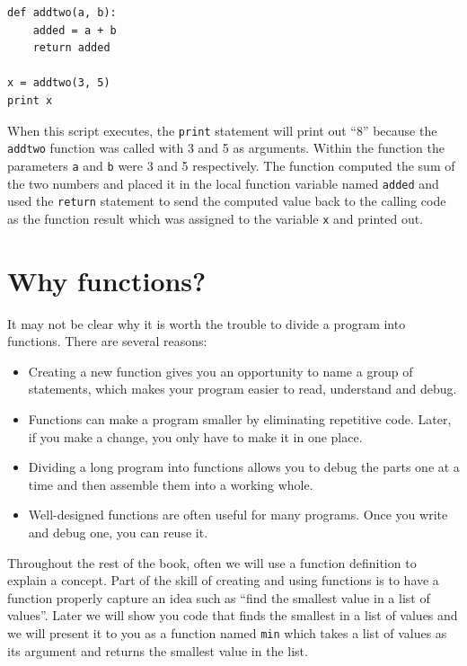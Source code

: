 \documentclass[10pt]{book}
\begin{document}
\beforeverb
\begin{verbatim}
def addtwo(a, b):
    added = a + b
    return added

x = addtwo(3, 5)
print x
\end{verbatim}
\afterverb
%
When this script executes, the {\tt print} statement will print out ``8''
because the {\tt addtwo} function was called with 3 and 5 as arguments.
Within the function the parameters {\tt a} and {\tt b} were 3 and 5 
respectively. The function computed the sum of the two numbers and placed
it in the local function variable named {\tt added} 
and used the {\tt return} statement 
to send the computed value back to the calling code 
as the function result which was assigned
to the variable {\tt x} and printed out.


\section{Why functions?}

It may not be clear why it is worth the trouble to divide
a program into functions.  There are several reasons:

\begin{itemize}

\item Creating a new function gives you an opportunity to name a group
of statements, which makes your program easier to read, understand 
and debug.

\item Functions can make a program smaller by eliminating repetitive
code.  Later, if you make a change, you only have
to make it in one place.

\item Dividing a long program into functions allows you to debug the
parts one at a time and then assemble them into a working whole.

\item Well-designed functions are often useful for many programs.
Once you write and debug one, you can reuse it.

\end{itemize}

Throughout the rest of the book, often we will use a function definition to 
explain a concept.  Part of the skill of creating and using functions is
to have a function properly capture an idea such as ``find the smallest
value in a list of values''.  Later we will show you code that finds
the smallest in a list of values and we will present it to you as a function
named {\tt min} which takes a list of values as its argument and 
returns the smallest value in the list.
\end{document}
